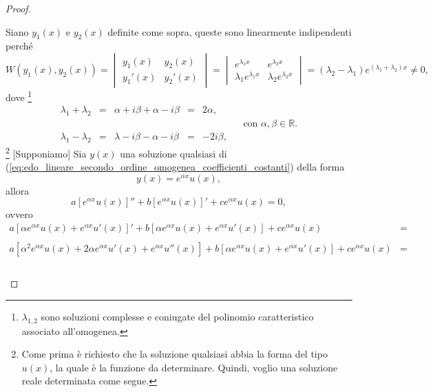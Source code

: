 \begin{proof}
\begin{enumerate}
		\noindent Siano $y_1(x)$ e $y_2(x)$ definite come sopra, queste sono linearmente indipendenti perché
		\begin{equation*}
				W(y_1(x),y_2(x)) = 
				\begin{vmatrix}
				y_1(x) & y_2(x)\\
				y_1'(x) & y_2'(x)
			\end{vmatrix} = 
			\begin{vmatrix}
				e^{\lambda_1x} & e^{\lambda_2 x}\\
				\lambda_1 e^{\lambda_1x} & \lambda_2 e^{\lambda_2 x}
			\end{vmatrix} = (\lambda_2 -\lambda_1) e^{(\lambda_1+\lambda_2)x}\neq 0,
		\end{equation*}
		dove \footnote{$\lambda_{1,2}$ sono soluzioni complesse e coniugate del polinomio caratteristico associato all'omogenea.}
		\begin{equation*}
			\begin{matrix}
				\lambda_1 + \lambda_2 &=& \alpha + i\beta + \alpha - i\beta &=& 2 \alpha,\\
				&&&&&&\text{con } \alpha,\beta\in\mathbb{R}.\\
				\lambda_1 - \lambda_2 &=& \lambda - i\beta - \alpha - i\beta &=& - 2i\beta,
			\end{matrix}
		\end{equation*}
		\footnote{Come prima è richiesto che la soluzione qualsiasi abbia la forma del tipo $u(x)$, la quale è la funzione da determinare. Quindi, voglio una soluzione reale determinata come segue.} [Supponiamo] Sia $y(x)$ una soluzione qualsiasi di (\ref{eq:edo_lineare_secondo_ordine_omogenea_coefficienti_costanti}) della forma
		\begin{equation*}
			y(x) = e^{\alpha x} u(x),
		\end{equation*}
		allora
		\begin{equation*}
				a[e^{\alpha x} u(x)]'' + b [e^{\alpha x} u(x)]' + c e^{\alpha x} u(x) = 0,
		\end{equation*}
		ovvero
		\begin{equation*}
			\begin{matrix}
				a [\alpha e^{\alpha x}u(x) + e^{\alpha x}u'(x)]' + b [\alpha e^{\alpha x}u(x) + e^{\alpha x}u'(x)] + c e^{\alpha x}u(x)&=&\\\\
				a[\alpha^2e^{\alpha x}u(x) + 2\alpha e^{\alpha x} u'(x) + e^{\alpha x}u''(x)] + b [\alpha e^{\alpha x}u(x) + e^{\alpha x}u'(x)] + c e^{\alpha x}u(x) &=&\\\\

\end{matrix}
\end{equation*}
\end{enumerate}
\end{proof}
